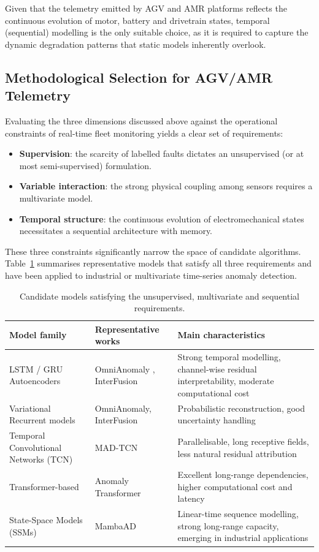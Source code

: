 Given that the telemetry emitted by AGV and AMR platforms reflects the continuous evolution of motor, battery and drivetrain states, temporal (sequential) modelling is the only suitable choice, as it is required to capture the dynamic degradation patterns that static models inherently overlook.

\subsection{Methodological Selection for AGV/AMR Telemetry}
\label{subsec:methodological-alignment}

Evaluating the three dimensions discussed above against the operational constraints of real-time fleet monitoring yields a clear set of requirements:

\begin{itemize}
    \item \textbf{Supervision}: the scarcity of labelled faults dictates an unsupervised (or at most semi-supervised) formulation.
    \item \textbf{Variable interaction}: the strong physical coupling among sensors requires a multivariate model.
    \item \textbf{Temporal structure}: the continuous evolution of electromechanical states necessitates a sequential architecture with memory.
\end{itemize}

These three constraints significantly narrow the space of candidate algorithms.
Table~\ref{tab:candidate-models} summarises representative models that satisfy all three requirements and have been applied to industrial or multivariate time-series anomaly detection.

\begin{table}[htbp]
\centering
\caption{Candidate models satisfying the unsupervised, multivariate and sequential requirements.}
\label{tab:candidate-models}
\begin{tabular}{@{}llp{6.2cm}@{}}
\toprule
\textbf{Model family} & \textbf{Representative works} & \textbf{Main characteristics} \\
\midrule
LSTM / GRU Autoencoders & OmniAnomaly \cite{su2019omnianomaly}, InterFusion \cite{shen2021interfusion} & Strong temporal modelling, channel-wise residual interpretability, moderate computational cost \\
Variational Recurrent models & OmniAnomaly, InterFusion & Probabilistic reconstruction, good uncertainty handling \\
Temporal Convolutional Networks (TCN) & MAD-TCN \cite{dan2026madtcn} & Parallelisable, long receptive fields, less natural residual attribution \\
Transformer-based & Anomaly Transformer \cite{xu2022anomaly} & Excellent long-range dependencies, higher computational cost and latency \\
State-Space Models (SSMs) & MambaAD \cite{qin2025mambaad} & Linear-time sequence modelling, strong long-range capacity, emerging in industrial applications \\
\bottomrule
\end{tabular}
\end{table}

